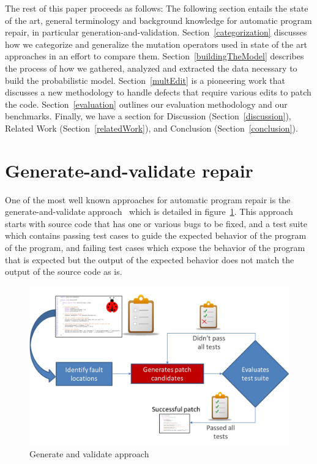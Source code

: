 \documentclass[conference]{IEEEtran}
\begin{document}
The rest of this paper proceeds as follows:
The following section entails the state of the art, general terminology and
background knowledge for automatic program repair, in particular
generation-and-validation. Section~\ref{categorization} discusses how we
categorize and generalize the mutation operators used in state of the art
approaches in an effort to compare them. Section~\ref{buildingTheModel}
describes the process of how we gathered, analyzed and extracted the data
necessary to build the probabilistic model. Section~\ref{multEdit} is a
pioneering work that discusses a new methodology to handle defects that require
various edits to patch the code. Section~\ref{evaluation} outlines our
evaluation methodology and our benchmarks.  Finally, we have a section for
Discussion (Section~\ref{discussion}), Related Work (Section~\ref{relatedWork}), and Conclusion (Section~\ref{conclusion}).

\section{Generate-and-validate repair} \label{background}

One of the most well known approaches for automatic program repair is the
generate-and-validate approach~\cite{legoues12} which is detailed in figure~\ref{fig:generateandvalidate}. This approach starts with source code that
has one or various bugs to be fixed, and a test suite which contains passing
test cases to guide the expected behavior of the program of the program, and failing test 
cases which expose the behavior of the program that is expected but the output
of the expected behavior does not match the output of the source code as is.



\begin{figure}[!h]
  \centering
    \includegraphics[scale=0.25]{Picture1}
  \caption{Generate and validate approach}
  \label{fig:generateandvalidate}
\end{figure}
\end{document}
